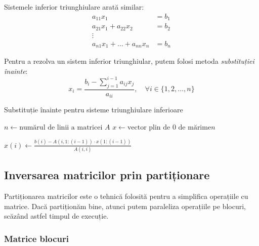 \documentclass{exam}
\newcommand{\octavescript}[2]{
	
}
\begin{document}
Sistemele inferior triunghiulare arată similar:
\begin{align*}
	a_{11} x_1                       & = b_1 \\
	a_{21} x_1 + a_{22} x_2          & = b_2 \\
	\vdots                                   \\
	a_{n1} x_1 + \ldots + a_{nn} x_n & = b_n
\end{align*}

Pentru a rezolva un sistem inferior triunghiular, putem folosi metoda
\textit{substituției înainte}:
\begin{equation}
	x_i = \frac{b_i - \sum_{j = 1}^{i - 1}{a_{ij} x_j}}{a_{ii}}, \quad \forall i \in \{1, 2, \ldots, n\}
\end{equation}


\begin{algorithm}
	\caption{Substituție înainte pentru sisteme triunghiulare inferioare}
	\begin{algorithmic}[1]
		\State \( n \gets \text{numărul de linii a matricei } A \)
		\State \( x \gets \text{vector plin de 0 de mărime} n \)

		\State \( x(i) \gets \frac{b(i) - A(i, 1:(i-1)) \cdot x(1:(i-1))}{A(i, i)} \)
		\EndFor

	\end{algorithmic}
\end{algorithm}

\subsection{Inversarea matricilor prin partiționare}

Partiționarea matricilor este o tehnică folosită pentru a simplifica operațiile
cu matrice. Dacă partiționăm bine, atunci putem paraleliza operațiile pe blocuri,
scăzând astfel timpul de execuție.

\subsubsection{Matrice blocuri}
\end{document}
